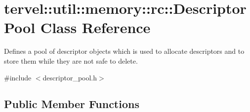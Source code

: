 \hypertarget{classtervel_1_1util_1_1memory_1_1rc_1_1_descriptor_pool}{}\section{tervel\+:\+:util\+:\+:memory\+:\+:rc\+:\+:Descriptor\+Pool Class Reference}
\label{classtervel_1_1util_1_1memory_1_1rc_1_1_descriptor_pool}


Defines a pool of descriptor objects which is used to allocate descriptors and to store them while they are not safe to delete.  




{\ttfamily \#include $<$descriptor\+\_\+pool.\+h$>$}

\subsection*{Public Member Functions}
